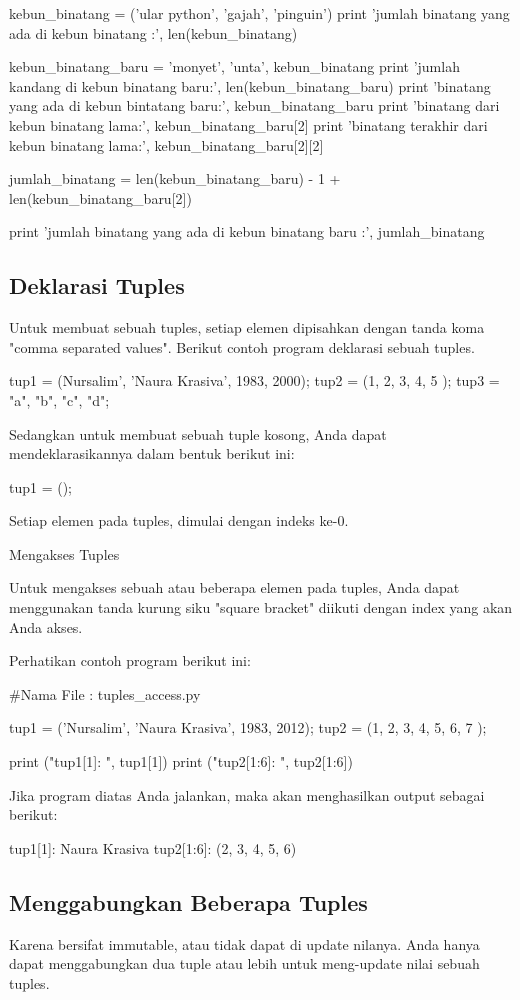 kebun_binatang = ('ular python', 'gajah', 'pinguin')
print 'jumlah binatang yang ada di kebun binatang :', len(kebun_binatang)

kebun_binatang_baru = 'monyet', 'unta', kebun_binatang
print 'jumlah kandang di kebun binatang baru:', len(kebun_binatang_baru)
print 'binatang yang ada di kebun bintatang baru:', kebun_binatang_baru
print 'binatang dari kebun binatang lama:', kebun_binatang_baru[2]
print 'binatang terakhir dari kebun binatang lama:', kebun_binatang_baru[2][2]

jumlah_binatang = len(kebun_binatang_baru) - 1 + len(kebun_binatang_baru[2])

print 'jumlah binatang yang ada di kebun binatang baru :', jumlah_binatang
\subsection {Deklarasi Tuples}


Untuk membuat sebuah tuples, setiap elemen dipisahkan dengan tanda koma "comma separated values". Berikut contoh program deklarasi sebuah tuples.

tup1 = (Nursalim', 'Naura Krasiva', 1983, 2000);
tup2 = (1, 2, 3, 4, 5 );
tup3 = "a", "b", "c", "d";

Sedangkan untuk membuat sebuah tuple kosong, Anda dapat mendeklarasikannya dalam bentuk berikut ini:

tup1 = ();

Setiap elemen pada tuples, dimulai dengan indeks ke-0.

Mengakses Tuples


Untuk mengakses sebuah atau beberapa elemen pada tuples, Anda dapat menggunakan tanda kurung siku "square bracket" diikuti dengan index yang akan Anda akses.

Perhatikan contoh program berikut ini:

#Nama File : tuples_access.py

tup1 = ('Nursalim', 'Naura Krasiva', 1983, 2012);
tup2 = (1, 2, 3, 4, 5, 6, 7 );

print ("tup1[1]: ", tup1[1])
print ("tup2[1:6]: ", tup2[1:6])

Jika program diatas Anda jalankan, maka akan menghasilkan output sebagai berikut:

tup1[1]:  Naura Krasiva
tup2[1:6]:  (2, 3, 4, 5, 6)


\subsection {Menggabungkan Beberapa Tuples}
Karena bersifat immutable, atau tidak dapat di update nilanya. Anda hanya dapat menggabungkan dua tuple atau lebih untuk meng-update nilai sebuah tuples.

